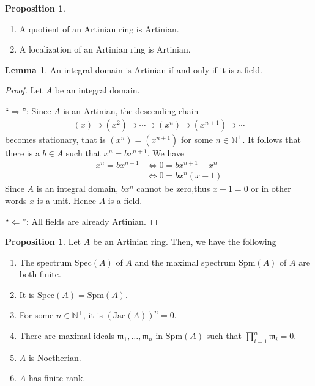 \documentclass[a4paper]{book}
\theoremstyle{definition}
\newtheorem{lemma}[definition]{Lemma}
\newtheorem{proposition}[definition]{Proposition}
\begin{document}
\begin{thmbox}
    \begin{proposition}
        \begin{enumerate}
            \item A quotient of an Artinian ring is Artinian.
            \item A localization of an Artinian ring is Artinian.
        \end{enumerate}
    \end{proposition}
\end{thmbox}

\begin{thmbox}
    \begin{lemma}
        An integral domain is Artinian if and only if it is a field.
    \end{lemma}
\end{thmbox}
\begin{proof}
    Let \(A\) be an integral domain.

    ``\(\Rightarrow\)'': Since \(A\) is an Artinian, the descending chain
    \begin{align*}
        (x) \supset (x^2) \supset \cdots \supset (x^n) \supset (x^{n+1}) \supset \cdots
    \end{align*}
    becomes stationary, that is \((x^n) = (x^{n+1})\) for some \(n \in \mathbb{N}^+\). It follows that there is a \(b \in A\) such that \(x^n = b x^{n+1}\). We have
    \begin{align*}
        x^n = b x^{n+1} &\iff 0 = b x^{n+1} - x^{n}\\
        &\iff 0 = bx^n (x - 1)
    \end{align*}
    Since \(A\) is an integral domain, \(bx^n\) cannot be zero,thus \(x - 1 = 0\) or in other words \(x\) is a unit. Hence \(A\) is a field.

    ``\(\Leftarrow\)'': All fields are already Artinian.
\end{proof}


\begin{thmbox}
    \begin{proposition}
        Let \(A\) be an Artinian ring. Then, we have the following
        \begin{enumerate}
            \item The spectrum \(\mathrm{Spec}(A)\) of \(A\) and the maximal spectrum \(\mathrm{Spm}(A)\) of \(A\) are both finite.
            \item It is \(\mathrm{Spec}(A) = \mathrm{Spm}(A)\).
            \item For some \(n \in \mathbb{N}^+\), it is \((\mathrm{Jac}(A))^n = 0\).
            \item There are maximal ideals \(\mathfrak{m}_1, \ldots, \mathfrak{m}_n\) in \(\mathrm{Spm}(A)\) such that \(\prod_{i = 1}^n \mathfrak{m}_i = 0\).
            \item \(A\) is Noetherian.
            \item \(A\) has finite rank.
        \end{enumerate}
    \end{proposition}
\end{thmbox}
\end{document}
